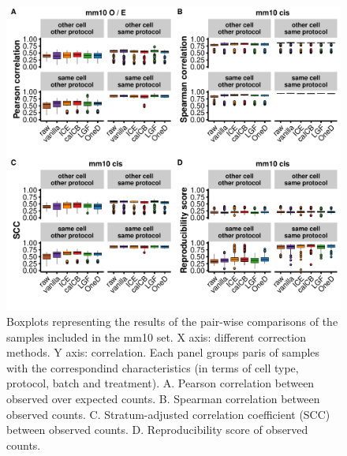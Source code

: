 \documentclass[12pt]{report}
\begin{document}
\begin{figure}
\centerline{\includegraphics[width=\textwidth]{img/correlation_normal_boxplots.pdf}}
\caption{Boxplots representing the results of the pair-wise comparisons of the
	samples included in the mm10 set. X axis: different correction methods. Y
    axis: correlation. Each panel groups paris of samples with the correspondind
    characteristics (in terms of cell type, protocol, batch and
    treatment). A. Pearson correlation between observed over expected
    counts. B. Spearman correlation between observed counts. C. Stratum-adjusted correlation
    coefficient (SCC) between observed counts. D. Reproducibility score of
    observed counts.}
\end{figure}
\end{document}
